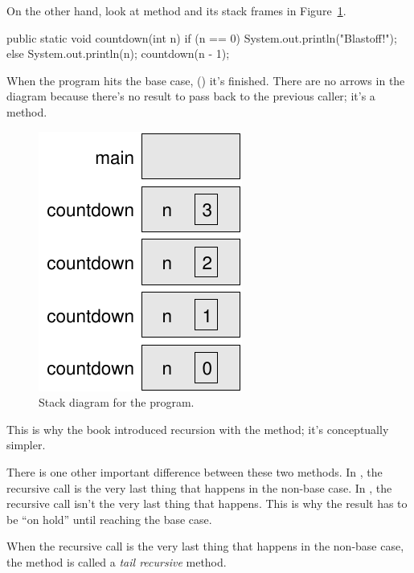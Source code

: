 On the other hand, look at  method and its stack frames in Figure~\ref{fig.countdown_stack}. 

\begin{code}
public static void countdown(int n) {
    if (n == 0) {
        System.out.println("Blastoff!");
    } else {
        System.out.println(n);
        countdown(n - 1);
    }
}
\end{code}

When the program hits the base case,  () it's finished. There are no arrows in the diagram because there's no result to pass back to the previous caller; it's a  method.

\begin{figure}[!htb]
\begin{center}
\includegraphics{figs/ch08/stack2.pdf}
\caption{Stack diagram for the  program.}
\label{fig.countdown_stack}
\end{center}
\end{figure}

This is why the book introduced recursion with the  method; it's conceptually simpler.

There is one other important difference between these two methods. In , the recursive call is the very last thing that happens in the non-base case.  In , the recursive call isn't the very last thing that happens. This is why the result has to be ``on hold'' until reaching the base case.

When the recursive call is the very last thing that happens in the non-base case, the method is called a {\em tail recursive} method.

